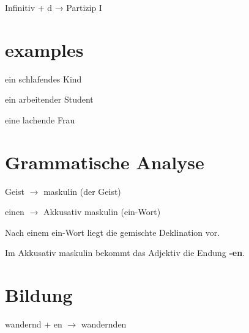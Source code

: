 \documentclass[a4paper]{article}
\title{}
\date{}
\begin{document}
    \maketitle
    Infinitiv + d → Partizip I
    
    \section{examples}
    
    ein schlafendes Kind

    ein arbeitender Student
    
    eine lachende Frau
    
    \section{Grammatische Analyse}
        
        Geist $\rightarrow$ maskulin (der Geist)
        
        einen $\rightarrow$ Akkusativ maskulin (ein-Wort)
        
        Nach einem ein-Wort liegt die gemischte Deklination vor.
        
        Im Akkusativ maskulin bekommt das Adjektiv die Endung \textbf{-en}.
    
    \section{Bildung}
        
        wandernd + en $\rightarrow$ wandernden
\end{document}
